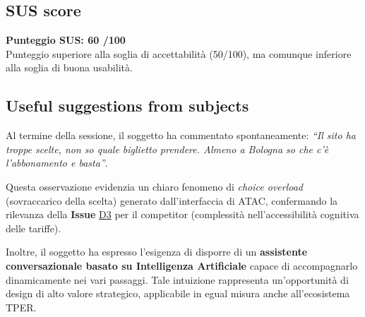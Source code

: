 ﻿\documentclass[11pt,a4paper]{article}
\begin{document}
\subsection*{SUS score}
\begin{tcolorbox}[base]
\textbf{Punteggio SUS: 60 /100}\\[0.2cm]
\small Punteggio superiore alla soglia di accettabilità
(50/100), ma comunque inferiore alla soglia di buona usabilità.
\end{tcolorbox}

\subsection*{Useful suggestions from subjects}
\begin{tcolorbox}[base]
Al termine della sessione, il soggetto ha commentato spontaneamente: \textit{``Il sito ha troppe scelte, non so quale biglietto prendere. Almeno a Bologna so che c'è l'abbonamento e basta''}. 

Questa osservazione evidenzia un chiaro fenomeno di \textit{choice overload} (sovraccarico della scelta) generato dall'interfaccia di ATAC, confermando la rilevanza della \textbf{Issue} \hyperref[atac:D3]{D3} per il competitor (complessità nell'accessibilità cognitiva delle tariffe).

Inoltre, il soggetto ha espresso l'esigenza di disporre di un \textbf{assistente conversazionale basato su Intelligenza Artificiale} capace di accompagnarlo dinamicamente nei vari passaggi. Tale intuizione rappresenta un'opportunità di design di alto valore strategico, applicabile in egual misura anche all'ecosistema TPER.
\end{tcolorbox}
\end{document}
